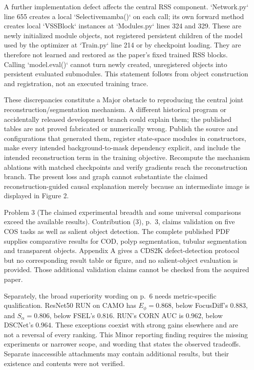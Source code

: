 \documentclass[10pt]{article}
\begin{document}
A further implementation defect affects the central RSS component. `Network.py` line 655 creates a local `Selectivemamba()` on each call; its own forward method creates local `VSSBlock` instances at `Modules.py` lines 324 and 329. These are newly initialized module objects, not registered persistent children of the model used by the optimizer at `Train.py` line 214 or by checkpoint loading. They are therefore not learned and restored as the paper’s fixed trained RSS blocks. Calling `model.eval()` cannot turn newly created, unregistered objects into persistent evaluated submodules. This statement follows from object construction and registration, not an executed training trace.\par
These discrepancies constitute a Major obstacle to reproducing the central joint reconstruction/segmentation mechanism. A different historical program or accidentally released development branch could explain them; the published tables are not proved fabricated or numerically wrong. Publish the source and configurations that generated them, register state-space modules in constructors, make every intended background-to-mask dependency explicit, and include the intended reconstruction term in the training objective. Recompute the mechanism ablations with matched checkpoints and verify gradients reach the reconstruction branch. The present loss and graph cannot substantiate the claimed reconstruction-guided causal explanation merely because an intermediate image is displayed in Figure 2.\par
Problem 3 (The claimed experimental breadth and some universal comparisons exceed the available results).  Contribution (3), p. 3, claims validation on five COS tasks as well as salient object detection. The complete published PDF supplies comparative results for COD, polyp segmentation, tubular segmentation and transparent objects. Appendix A gives a CDS2K defect-detection protocol but no corresponding result table or figure, and no salient-object evaluation is provided. Those additional validation claims cannot be checked from the acquired paper.\par
Separately, the broad superiority wording on p. 6 needs metric-specific qualification. ResNet50 RUN on CAMO has \(E_\phi=0.868\), below FocusDiff’s \(0.883\), and \(S_\alpha=0.806\), below FSEL’s \(0.816\). RUN’s CORN AUC is \(0.962\), below DSCNet’s \(0.964\). These exceptions coexist with strong gains elsewhere and are not a reversal of every ranking. This Minor reporting finding requires the missing experiments or narrower scope, and wording that states the observed tradeoffs. Separate inaccessible attachments may contain additional results, but their existence and contents were not verified.\par
\end{document}
